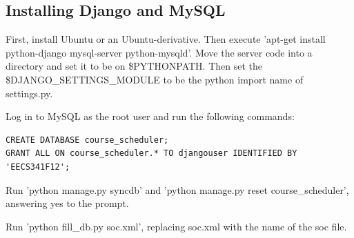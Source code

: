\documentclass[pdftex,12pt,letter]{article}
\begin{document}
\subsection{Installing Django and MySQL}
First, install Ubuntu or an Ubuntu-derivative.  Then execute 'apt-get install python-django mysql-server python-mysqld'.  Move the server code into a directory and set it to be on \$PYTHONPATH.  Then set the \$DJANGO\_SETTINGS\_MODULE to be the python import name of settings.py.

Log in to MySQL as the root user and run the following commands:

\begin{verbatim}
CREATE DATABASE course_scheduler;
GRANT ALL ON course_scheduler.* TO djangouser IDENTIFIED BY 'EECS341F12';
\end{verbatim}

Run 'python manage.py syncdb' and 'python manage.py reset course\_scheduler', answering yes to the prompt.

Run 'python fill\_db.py soc.xml', replacing soc.xml with the name of the soc file.
\end{document}
